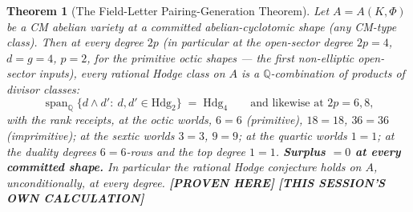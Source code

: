 \documentclass[11pt]{article}
\newtheorem{theorem}{Theorem}
\newcommand{\PROVEN}{\textbf{[PROVEN HERE]}}
\newcommand{\MINE}{\textbf{[THIS SESSION'S OWN CALCULATION]}}
\newcommand{\Q}{\mathbb{Q}}
\newcommand{\spann}{\operatorname{span}}
\newcommand{\Hdg}{\mathrm{Hdg}}
\begin{document}
\begin{theorem}[The Field-Letter Pairing-Generation Theorem]\label{thm:s15}
Let $A=A(K,\Phi)$ be a CM abelian variety at a committed abelian-cyclotomic
shape (any CM-type class). Then at \emph{every} degree $2p$ (in particular at the
open-sector degree $2p=4$, $d=g=4$, $p=2$, for the primitive octic shapes ---
the first non-elliptic open-sector inputs), every rational Hodge class on $A$ is
a $\Q$-combination of products of \emph{divisor} classes:
\[
\spann_\Q\{d\wedge d':\ d,d'\in\Hdg_2\}\;=\;\Hdg_4
\qquad\text{and likewise at }2p=6,8,
\]
with the rank receipts, at the octic worlds, $6=6$ (primitive), $18=18$, $36=36$
(imprimitive); at the sextic worlds $3=3$, $9=9$; at the quartic worlds $1=1$;
at the duality degrees $6=6$-rows and the top degree $1=1$.
\textbf{Surplus $=0$ at every committed shape.} In particular the rational Hodge
conjecture holds on $A$, unconditionally, at every degree.
\PROVEN{} \MINE{}
\end{theorem}
\end{document}
